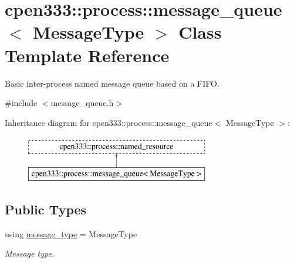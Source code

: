 \hypertarget{classcpen333_1_1process_1_1message__queue}{}\section{cpen333\+:\+:process\+:\+:message\+\_\+queue$<$ Message\+Type $>$ Class Template Reference}
\label{classcpen333_1_1process_1_1message__queue}


Basic inter-\/process named message queue based on a F\+I\+FO.  




{\ttfamily \#include $<$message\+\_\+queue.\+h$>$}

Inheritance diagram for cpen333\+:\+:process\+:\+:message\+\_\+queue$<$ Message\+Type $>$\+:\begin{figure}[H]
\begin{center}
\leavevmode
\includegraphics[height=2.000000cm]{classcpen333_1_1process_1_1message__queue}
\end{center}
\end{figure}
\subsection*{Public Types}
\begin{DoxyCompactItemize}
\item 
\mbox{\label{classcpen333_1_1process_1_1message__queue_af5c7db435edf1cda9fced975f04705ff}} 
using \hyperlink{classcpen333_1_1process_1_1message__queue_af5c7db435edf1cda9fced975f04705ff}{message\+\_\+type} = Message\+Type
\begin{DoxyCompactList}\small\item\em Message type. \end{DoxyCompactList}\end{DoxyCompactItemize}
